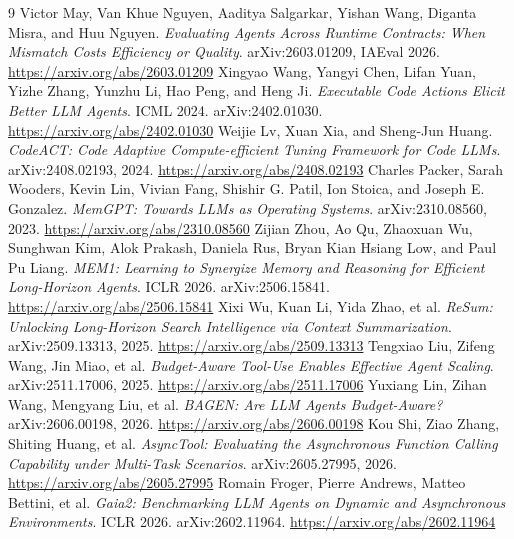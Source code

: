 \documentclass[11pt,a4paper]{article}
\begin{document}
\small
\begin{thebibliography}{9}
 Victor May, Van Khue Nguyen, Aaditya Salgarkar, Yishan Wang, Diganta Misra, and Huu Nguyen. \emph{Evaluating Agents Across Runtime Contracts: When Mismatch Costs Efficiency or Quality}. arXiv:2603.01209, IAEval 2026. \url{https://arxiv.org/abs/2603.01209}
 Xingyao Wang, Yangyi Chen, Lifan Yuan, Yizhe Zhang, Yunzhu Li, Hao Peng, and Heng Ji. \emph{Executable Code Actions Elicit Better LLM Agents}. ICML 2024. arXiv:2402.01030. \url{https://arxiv.org/abs/2402.01030}
 Weijie Lv, Xuan Xia, and Sheng-Jun Huang. \emph{CodeACT: Code Adaptive Compute-efficient Tuning Framework for Code LLMs}. arXiv:2408.02193, 2024. \url{https://arxiv.org/abs/2408.02193}
 Charles Packer, Sarah Wooders, Kevin Lin, Vivian Fang, Shishir G. Patil, Ion Stoica, and Joseph E. Gonzalez. \emph{MemGPT: Towards LLMs as Operating Systems}. arXiv:2310.08560, 2023. \url{https://arxiv.org/abs/2310.08560}
 Zijian Zhou, Ao Qu, Zhaoxuan Wu, Sunghwan Kim, Alok Prakash, Daniela Rus, Bryan Kian Hsiang Low, and Paul Pu Liang. \emph{MEM1: Learning to Synergize Memory and Reasoning for Efficient Long-Horizon Agents}. ICLR 2026. arXiv:2506.15841. \url{https://arxiv.org/abs/2506.15841}
 Xixi Wu, Kuan Li, Yida Zhao, et al. \emph{ReSum: Unlocking Long-Horizon Search Intelligence via Context Summarization}. arXiv:2509.13313, 2025. \url{https://arxiv.org/abs/2509.13313}
 Tengxiao Liu, Zifeng Wang, Jin Miao, et al. \emph{Budget-Aware Tool-Use Enables Effective Agent Scaling}. arXiv:2511.17006, 2025. \url{https://arxiv.org/abs/2511.17006}
 Yuxiang Lin, Zihan Wang, Mengyang Liu, et al. \emph{BAGEN: Are LLM Agents Budget-Aware?} arXiv:2606.00198, 2026. \url{https://arxiv.org/abs/2606.00198}
 Kou Shi, Ziao Zhang, Shiting Huang, et al. \emph{AsyncTool: Evaluating the Asynchronous Function Calling Capability under Multi-Task Scenarios}. arXiv:2605.27995, 2026. \url{https://arxiv.org/abs/2605.27995}
 Romain Froger, Pierre Andrews, Matteo Bettini, et al. \emph{Gaia2: Benchmarking LLM Agents on Dynamic and Asynchronous Environments}. ICLR 2026. arXiv:2602.11964. \url{https://arxiv.org/abs/2602.11964}
\end{thebibliography}
\end{document}
